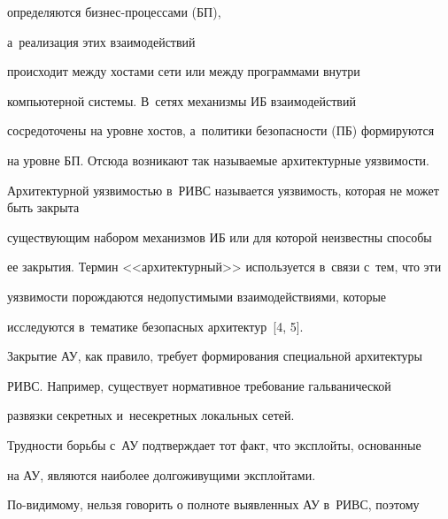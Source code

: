 определяются биз\-нес-про\-цес\-са\-ми (БП),


\linebreak\vspace*{-12pt}





\pagebreak





\noindent


 а~реализация этих взаимодействий 


происходит между хостами сети или между программами внутри 


компьютерной системы. В~сетях механизмы ИБ взаимодействий 


сосредоточены на уровне хостов, а~политики безопасности (ПБ) формируются 


на уровне БП. Отсюда возникают так называемые архитектурные уязвимости. 


Архитектурной уязвимостью в~РИВС называется уязвимость, которая не может быть закрыта 


существующим набором механизмов ИБ или для которой неизвестны способы 


ее закрытия. Термин <<архитектурный>> используется в~связи с~тем, что эти 


уязвимости порождаются недопустимыми взаимодействиями, которые 


исследуются в~тематике безопасных архитектур~[4, 5].


{





}


  


  Закрытие АУ, как правило, требует формирования специальной архитектуры 


РИВС. Например, существует нормативное требование гальванической 


развязки секретных и~несекретных локальных сетей. 


  


  Трудности борьбы с~АУ подтверждает тот факт, что эксплойты, основанные 


на АУ, являются наиболее долгоживущими эксплойтами. 


  


  По-видимому, нельзя говорить о полноте выявленных АУ в~РИВС, поэтому 



